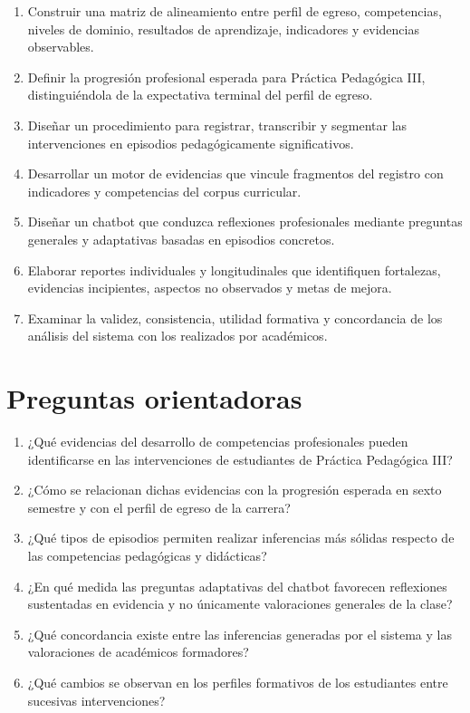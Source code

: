 \documentclass[11pt,a4paper]{article}
\begin{document}
\begin{enumerate}
    \item Construir una matriz de alineamiento entre perfil de egreso, competencias, niveles de dominio, resultados de aprendizaje, indicadores y evidencias observables.
    \item Definir la progresión profesional esperada para Práctica Pedagógica III, distinguiéndola de la expectativa terminal del perfil de egreso.
    \item Diseñar un procedimiento para registrar, transcribir y segmentar las intervenciones en episodios pedagógicamente significativos.
    \item Desarrollar un motor de evidencias que vincule fragmentos del registro con indicadores y competencias del corpus curricular.
    \item Diseñar un chatbot que conduzca reflexiones profesionales mediante preguntas generales y adaptativas basadas en episodios concretos.
    \item Elaborar reportes individuales y longitudinales que identifiquen fortalezas, evidencias incipientes, aspectos no observados y metas de mejora.
    \item Examinar la validez, consistencia, utilidad formativa y concordancia de los análisis del sistema con los realizados por académicos.
\end{enumerate}

\section{Preguntas orientadoras}

\begin{enumerate}
    \item ¿Qué evidencias del desarrollo de competencias profesionales pueden identificarse en las intervenciones de estudiantes de Práctica Pedagógica III?
    \item ¿Cómo se relacionan dichas evidencias con la progresión esperada en sexto semestre y con el perfil de egreso de la carrera?
    \item ¿Qué tipos de episodios permiten realizar inferencias más sólidas respecto de las competencias pedagógicas y didácticas?
    \item ¿En qué medida las preguntas adaptativas del chatbot favorecen reflexiones sustentadas en evidencia y no únicamente valoraciones generales de la clase?
    \item ¿Qué concordancia existe entre las inferencias generadas por el sistema y las valoraciones de académicos formadores?
    \item ¿Qué cambios se observan en los perfiles formativos de los estudiantes entre sucesivas intervenciones?
\end{enumerate}
\end{document}
